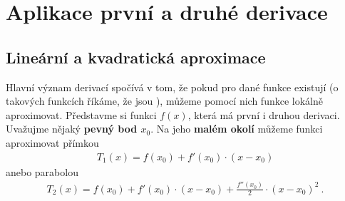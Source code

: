 \section{Aplikace první a druhé derivace}

\subsection{Lineární a kvadratická aproximace}

Hlavní význam derivací spočívá v tom, že pokud pro dané funkce existují (o takových funkcích říkáme, že jsou ), můžeme pomocí nich funkce lokálně aproximovat.
Představme si funkci $f(x)$, která má první i druhou derivaci. Uvažujme nějaký \textbf{pevný bod $x_0$}. Na jeho \textbf{malém okolí} můžeme funkci aproximovat přímkou
\begin{align}
    \boxed{ T_1(x) = f(x_0) + f'(x_0) \cdot (x-x_0) }
\end{align}
anebo parabolou
\begin{align}
    \boxed{ T_2(x) = f(x_0) + f'(x_0) \cdot (x-x_0) +\frac{f''(x_0)}{2}  \cdot (x-x_0)^2 }\:.
\end{align}

